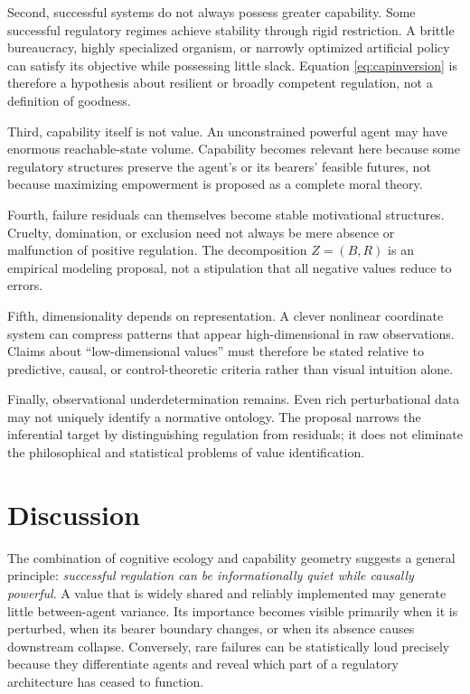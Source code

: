 \documentclass[11pt]{article}
\begin{document}
Second, successful systems do not always possess greater capability. Some successful regulatory regimes achieve stability through rigid restriction. A brittle bureaucracy, highly specialized organism, or narrowly optimized artificial policy can satisfy its objective while possessing little slack. Equation \eqref{eq:capinversion} is therefore a hypothesis about resilient or broadly competent regulation, not a definition of goodness.

Third, capability itself is not value. An unconstrained powerful agent may have enormous reachable-state volume. Capability becomes relevant here because some regulatory structures preserve the agent's or its bearers' feasible futures, not because maximizing empowerment is proposed as a complete moral theory.

Fourth, failure residuals can themselves become stable motivational structures. Cruelty, domination, or exclusion need not always be mere absence or malfunction of positive regulation. The decomposition $Z=(B,R)$ is an empirical modeling proposal, not a stipulation that all negative values reduce to errors.

Fifth, dimensionality depends on representation. A clever nonlinear coordinate system can compress patterns that appear high-dimensional in raw observations. Claims about ``low-dimensional values'' must therefore be stated relative to predictive, causal, or control-theoretic criteria rather than visual intuition alone.

Finally, observational underdetermination remains. Even rich perturbational data may not uniquely identify a normative ontology. The proposal narrows the inferential target by distinguishing regulation from residuals; it does not eliminate the philosophical and statistical problems of value identification.

\section{Discussion}

The combination of cognitive ecology and capability geometry suggests a general principle: \emph{successful regulation can be informationally quiet while causally powerful}. A value that is widely shared and reliably implemented may generate little between-agent variance. Its importance becomes visible primarily when it is perturbed, when its bearer boundary changes, or when its absence causes downstream collapse. Conversely, rare failures can be statistically loud precisely because they differentiate agents and reveal which part of a regulatory architecture has ceased to function.
\end{document}
